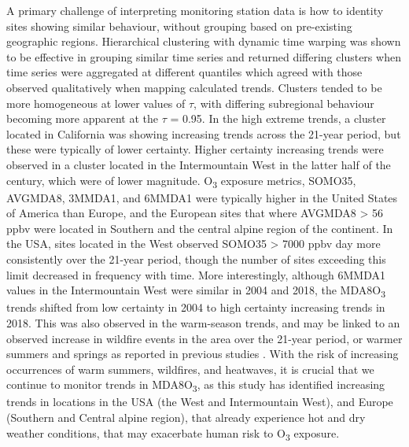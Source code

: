 \documentclass[journal abbreviation, manuscript]{copernicus}
\begin{document}
A primary challenge of interpreting monitoring station data is how to identity sites showing similar behaviour, without grouping based on pre-existing geographic regions. Hierarchical clustering with dynamic time warping was shown to be effective in grouping similar time series and returned differing clusters when time series were aggregated at different quantiles which agreed with those observed qualitatively when mapping calculated trends. Clusters tended to be more homogeneous at lower values of $\tau$, with differing subregional behaviour becoming more apparent at the $\tau$ = 0.95. In the high extreme trends, a cluster located in California was showing increasing trends across the 21-year period, but these were typically of lower certainty. Higher certainty increasing trends were observed in a cluster located in the Intermountain West in the latter half of the century, which were of lower magnitude. O\textsubscript{3} exposure metrics, SOMO35, AVGMDA8, 3MMDA1, and 6MMDA1 were typically higher in the United States of America than Europe, and the European sites that where AVGMDA8 > 56 ppbv were located in Southern and the central alpine region of the continent. In the USA, sites located in the West observed SOMO35 > 7000 ppbv day more consistently over the 21-year period, though the number of sites exceeding this limit decreased in frequency with time. More interestingly, although 6MMDA1 values in the Intermountain West were similar in 2004 and 2018, the MDA8O\textsubscript{3} trends shifted from low certainty in 2004 to high certainty increasing trends in 2018. This was also observed in the warm-season trends, and may be linked to an observed increase in wildfire events in the area over the 21-year period, or warmer summers and springs as reported in previous studies \citep{Lin2017, Li2021, Peterson2021, Iglesias2022}. With the risk of increasing occurrences of warm summers, wildfires, and heatwaves, it is crucial that we continue to monitor trends in MDA8O\textsubscript{3}, as this study has identified increasing trends in locations in the USA (the West and Intermountain West), and Europe (Southern and Central alpine region), that already experience hot and dry weather conditions, that may exacerbate human risk to O\textsubscript{3} exposure.

\clearpage

\end{document}
